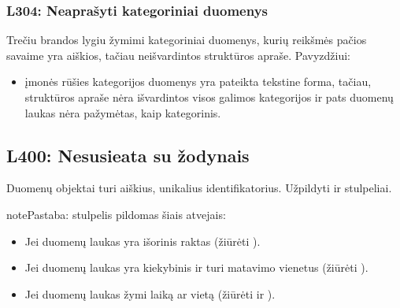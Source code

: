 \documentclass[letterpaper,10pt,lithuanian]{sphinxmanual}
\begin{document}
\subsubsection{L304: Neaprašyti kategoriniai duomenys}
\label{\detokenize{branda:l304-neaprasyti-kategoriniai-duomenys}}\label{\detokenize{branda:l304}}
\sphinxAtStartPar
Trečiu brandos lygiu žymimi kategoriniai duomenys, kurių reikšmės pačios
savaime yra aiškios, tačiau neišvardintos struktūros apraše. Pavyzdžiui:
\begin{itemize}
\item {} 
\sphinxAtStartPar
{} \sphinxhyphen{} įmonės rūšies kategorijos duomenys yra pateikta
tekstine forma, tačiau, struktūros apraše nėra išvardintos visos
galimos kategorijos ir pats duomenų laukas nėra pažymėtas, kaip
kategorinis.

\end{itemize}


\subsection{L400: Nesusieata su žodynais}
\label{\detokenize{branda:l400-nesusieata-su-zodynais}}\label{\detokenize{branda:l400}}
\sphinxAtStartPar
Duomenų objektai turi aiškius, unikalius identifikatorius. Užpildyti
{\hyperref[\detokenize{dimensijos:model.ref}]{}} ir {\hyperref[\detokenize{dimensijos:property.ref}]{}} stulpeliai.

\begin{sphinxadmonition}{note}{Pastaba:}
\sphinxAtStartPar
{\hyperref[\detokenize{dimensijos:property.ref}]{}} stulpelis pildomas šiais atvejais:
\begin{itemize}
\item {} 
\sphinxAtStartPar
Jei duomenų laukas yra išorinis raktas (žiūrėti ).

\item {} 
\sphinxAtStartPar
Jei duomenų laukas yra kiekybinis ir turi matavimo vienetus
(žiūrėti {\hyperref[\detokenize{vienetai:matavimo-vienetai}]{}}).

\item {} 
\sphinxAtStartPar
Jei duomenų laukas žymi laiką ar vietą (žiūrėti
 ir ).

\end{itemize}
\end{sphinxadmonition}
\end{document}
